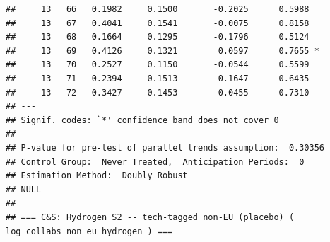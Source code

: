 \documentclass[
]{article}
\begin{document}
\begin{verbatim}
##     13   66   0.1982     0.1500       -0.2025      0.5988  
##     13   67   0.4041     0.1541       -0.0075      0.8158  
##     13   68   0.1664     0.1295       -0.1796      0.5124  
##     13   69   0.4126     0.1321        0.0597      0.7655 *
##     13   70   0.2527     0.1150       -0.0544      0.5599  
##     13   71   0.2394     0.1513       -0.1647      0.6435  
##     13   72   0.3427     0.1453       -0.0455      0.7310  
## ---
## Signif. codes: `*' confidence band does not cover 0
## 
## P-value for pre-test of parallel trends assumption:  0.30356
## Control Group:  Never Treated,  Anticipation Periods:  0
## Estimation Method:  Doubly Robust
## NULL
## 
## === C&S: Hydrogen S2 -- tech-tagged non-EU (placebo) ( log_collabs_non_eu_hydrogen ) ===
\end{verbatim}
\end{document}
